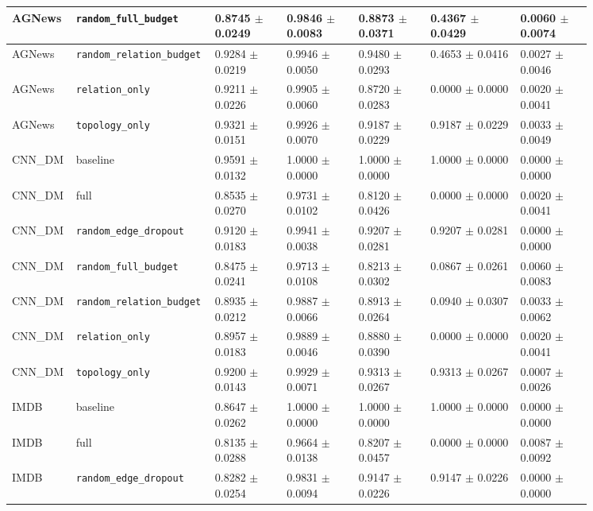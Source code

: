 \documentclass[preprint,12pt]{elsarticle}
\begin{document}
\begin{landscape}
\begin{longtable}{|L{0.07\linewidth}|L{0.15\linewidth}|C{0.12\linewidth}|C{0.12\linewidth}|C{0.12\linewidth}|C{0.15\linewidth}|C{0.12\linewidth}|}
AGNews & \nolinkurl{random_full_budget} & 0.8745 $\pm$ 0.0249 & 0.9846 $\pm$ 0.0083 & 0.8873 $\pm$ 0.0371 & 0.4367 $\pm$ 0.0429 & 0.0060 $\pm$ 0.0074 \\ \hline
AGNews & \nolinkurl{random_relation_budget} & 0.9284 $\pm$ 0.0219 & 0.9946 $\pm$ 0.0050 & 0.9480 $\pm$ 0.0293 & 0.4653 $\pm$ 0.0416 & 0.0027 $\pm$ 0.0046 \\ \hline
AGNews & \nolinkurl{relation_only} & 0.9211 $\pm$ 0.0226 & 0.9905 $\pm$ 0.0060 & 0.8720 $\pm$ 0.0283 & 0.0000 $\pm$ 0.0000 & 0.0020 $\pm$ 0.0041 \\ \hline
AGNews & \nolinkurl{topology_only} & 0.9321 $\pm$ 0.0151 & 0.9926 $\pm$ 0.0070 & 0.9187 $\pm$ 0.0229 & 0.9187 $\pm$ 0.0229 & 0.0033 $\pm$ 0.0049 \\ \hline
CNN\_DM & baseline & 0.9591 $\pm$ 0.0132 & 1.0000 $\pm$ 0.0000 & 1.0000 $\pm$ 0.0000 & 1.0000 $\pm$ 0.0000 & 0.0000 $\pm$ 0.0000 \\ \hline
CNN\_DM & full & 0.8535 $\pm$ 0.0270 & 0.9731 $\pm$ 0.0102 & 0.8120 $\pm$ 0.0426 & 0.0000 $\pm$ 0.0000 & 0.0020 $\pm$ 0.0041 \\ \hline
CNN\_DM & \nolinkurl{random_edge_dropout} & 0.9120 $\pm$ 0.0183 & 0.9941 $\pm$ 0.0038 & 0.9207 $\pm$ 0.0281 & 0.9207 $\pm$ 0.0281 & 0.0000 $\pm$ 0.0000 \\ \hline
CNN\_DM & \nolinkurl{random_full_budget} & 0.8475 $\pm$ 0.0241 & 0.9713 $\pm$ 0.0108 & 0.8213 $\pm$ 0.0302 & 0.0867 $\pm$ 0.0261 & 0.0060 $\pm$ 0.0083 \\ \hline
CNN\_DM & \nolinkurl{random_relation_budget} & 0.8935 $\pm$ 0.0212 & 0.9887 $\pm$ 0.0066 & 0.8913 $\pm$ 0.0264 & 0.0940 $\pm$ 0.0307 & 0.0033 $\pm$ 0.0062 \\ \hline
CNN\_DM & \nolinkurl{relation_only} & 0.8957 $\pm$ 0.0183 & 0.9889 $\pm$ 0.0046 & 0.8880 $\pm$ 0.0390 & 0.0000 $\pm$ 0.0000 & 0.0020 $\pm$ 0.0041 \\ \hline
CNN\_DM & \nolinkurl{topology_only} & 0.9200 $\pm$ 0.0143 & 0.9929 $\pm$ 0.0071 & 0.9313 $\pm$ 0.0267 & 0.9313 $\pm$ 0.0267 & 0.0007 $\pm$ 0.0026 \\ \hline
IMDB & baseline & 0.8647 $\pm$ 0.0262 & 1.0000 $\pm$ 0.0000 & 1.0000 $\pm$ 0.0000 & 1.0000 $\pm$ 0.0000 & 0.0000 $\pm$ 0.0000 \\ \hline
IMDB & full & 0.8135 $\pm$ 0.0288 & 0.9664 $\pm$ 0.0138 & 0.8207 $\pm$ 0.0457 & 0.0000 $\pm$ 0.0000 & 0.0087 $\pm$ 0.0092 \\ \hline
IMDB & \nolinkurl{random_edge_dropout} & 0.8282 $\pm$ 0.0254 & 0.9831 $\pm$ 0.0094 & 0.9147 $\pm$ 0.0226 & 0.9147 $\pm$ 0.0226 & 0.0000 $\pm$ 0.0000 \\ \hline

\end{longtable}
\end{landscape}
\end{document}
